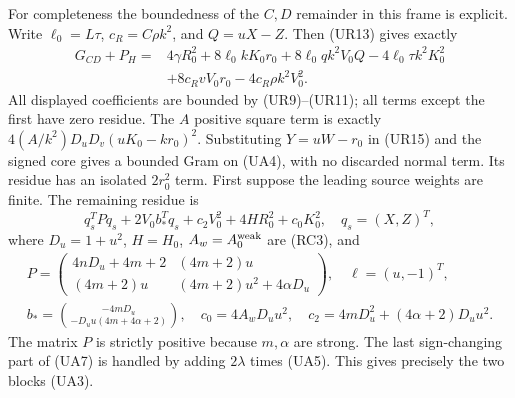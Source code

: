 For completeness the boundedness of the $C,D$ remainder in this frame
is explicit. Write $\ell_0=L\tau$, $c_R=C\rho k^2$, and
$Q=uX-Z$. Then (UR13) gives exactly
\begin{align*}
 G_{CD}+P_H={}&4\gamma R_0^2
 +8\ell_0kK_0r_0+8\ell_0qk^2V_0Q-4\ell_0\tau k^2K_0^2\\
 &+8c_RvV_0r_0-4c_R\rho k^2V_0^2.                  \tag{UA6}
\end{align*}
All displayed coefficients are bounded by (UR9)--(UR11); all terms
except the first have zero residue. The $A$ positive square term is exactly
$4(A/k^2)D_uD_v(uK_0-kr_0)^2$. Substituting
$Y=uW-r_0$ in (UR15) and the signed core gives a bounded Gram on
(UA4), with no discarded normal term. Its residue has an isolated
$2r_0^2$ term. First suppose the leading source weights are finite.
The remaining residue is
\[
 q_s^TPq_s+2V_0b_*^Tq_s+c_2V_0^2+4H R_0^2+c_0K_0^2,
 \quad q_s=(X,Z)^T,                                  \tag{UA7}
\]
where $D_u=1+u^2$, $H=H_0$, $A_w=A_0^{\rm weak}$ are (RC3), and
\[
\begin{gathered}
 P=\begin{pmatrix}
 4nD_u+4m+2&(4m+2)u\\
 (4m+2)u&(4m+2)u^2+4\alpha D_u
 \end{pmatrix},\quad \ell=(u,-1)^T,\\
 b_*=\binom{-4mD_u}{-D_uu(4m+4\alpha+2)},\quad
 c_0=4A_wD_uu^2,\quad
 c_2=4mD_u^2+(4\alpha+2)D_uu^2.                      
\end{gathered}
\tag{UA8}
\]
The matrix $P$ is strictly positive because $m,\alpha$ are strong.
The last sign-changing part of (UA7) is handled by adding
$2\lambda$ times (UA5). This gives precisely the two blocks (UA3).

